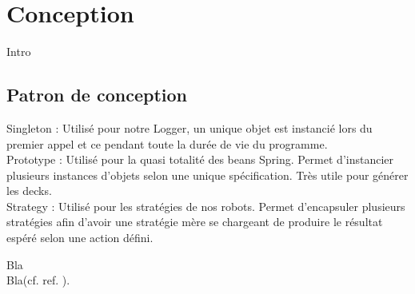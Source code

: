 \chapter{Conception}
\label{conception}
Intro\footnotemark\\

\section{Patron de conception}

{}

Singleton : Utilisé pour notre Logger, un unique objet est instancié lors du premier appel et ce pendant toute la durée de vie du programme.\\

Prototype : Utilisé pour la quasi totalité des beans Spring. Permet d'instancier plusieurs instances d'objets selon une unique spécification. Très utile pour générer les decks.\\

Strategy : Utilisé pour les stratégies de nos robots. Permet d'encapsuler plusieurs stratégies afin d'avoir une stratégie mère se chargeant de produire le résultat espéré selon une action défini.




Bla\footnotemark\\

Bla(cf. ref. \cite{cite6}).

